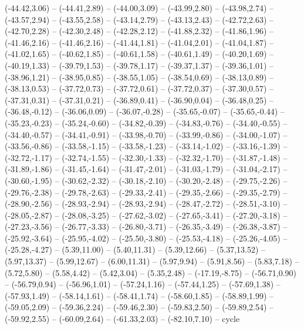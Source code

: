 {  (-44.42,3.06) -- (-44.41,2.89) -- (-44.00,3.09) -- (-43.99,2.80) -- (-43.98,2.74) -- (-43.57,2.94) -- (-43.55,2.58) --
  (-43.14,2.79) -- (-43.13,2.43) -- (-42.72,2.63) -- (-42.70,2.28) -- (-42.30,2.48) -- (-42.28,2.12) -- (-41.88,2.32) --
  (-41.86,1.96) -- (-41.46,2.16) -- (-41.46,2.16) -- (-41.44,1.81) -- (-41.04,2.01) -- (-41.04,1.87) -- (-41.02,1.65) --
  (-40.62,1.85) -- (-40.61,1.58) -- (-40.61,1.49) -- (-40.20,1.69) -- (-40.19,1.33) -- (-39.79,1.53) -- (-39.78,1.17) --
  (-39.37,1.37) -- (-39.36,1.01) -- (-38.96,1.21) -- (-38.95,0.85) -- (-38.55,1.05) -- (-38.54,0.69) -- (-38.13,0.89) --
  (-38.13,0.53) -- (-37.72,0.73) -- (-37.72,0.61) -- (-37.72,0.37) -- (-37.30,0.57) -- (-37.31,0.31) -- (-37.31,0.21) --
  (-36.89,0.41) -- (-36.90,0.04) -- (-36.48,0.25) -- (-36.48,-0.12) -- (-36.06,0.09) -- (-36.07,-0.28) -- (-35.65,-0.07) --
  (-35.65,-0.44) -- (-35.23,-0.23) -- (-35.24,-0.60) -- (-34.82,-0.39) -- (-34.83,-0.76) -- (-34.40,-0.55) -- (-34.40,-0.57) --
  (-34.41,-0.91) -- (-33.98,-0.70) -- (-33.99,-0.86) -- (-34.00,-1.07) -- (-33.56,-0.86) -- (-33.58,-1.15) -- (-33.58,-1.23) --
  (-33.14,-1.02) -- (-33.16,-1.39) -- (-32.72,-1.17) -- (-32.74,-1.55) -- (-32.30,-1.33) -- (-32.32,-1.70) -- (-31.87,-1.48) --
  (-31.89,-1.86) -- (-31.45,-1.64) -- (-31.47,-2.01) -- (-31.03,-1.79) -- (-31.04,-2.17) -- (-30.60,-1.95) -- (-30.62,-2.32) --
  (-30.18,-2.10) -- (-30.20,-2.48) -- (-29.75,-2.26) -- (-29.76,-2.38) -- (-29.78,-2.63) -- (-29.33,-2.41) -- (-29.35,-2.66) --
  (-29.35,-2.79) -- (-28.90,-2.56) -- (-28.93,-2.94) -- (-28.93,-2.94) -- (-28.47,-2.72) -- (-28.51,-3.10) -- (-28.05,-2.87) --
  (-28.08,-3.25) -- (-27.62,-3.02) -- (-27.65,-3.41) -- (-27.20,-3.18) -- (-27.23,-3.56) -- (-26.77,-3.33) -- (-26.80,-3.71) --
  (-26.35,-3.49) -- (-26.38,-3.87) -- (-25.92,-3.64) -- (-25.95,-4.02) -- (-25.50,-3.80) -- (-25.53,-4.18) -- (-25.26,-4.05) --
  (-25.28,-4.27) -- (5.39,11.00) -- (5.40,11.31) -- (5.39,12.66) -- (5.37,13.52) -- (5.97,13.37) -- (5.99,12.67) --
  (6.00,11.31) -- (5.97,9.94) -- (5.91,8.56) -- (5.83,7.18) -- (5.72,5.80) -- (5.58,4.42) -- (5.42,3.04) --
  (5.35,2.48) -- (-17.19,-8.75) -- (-56.71,0.90) -- (-56.79,0.94) -- (-56.96,1.01) -- (-57.24,1.16) -- (-57.44,1.25) --
  (-57.69,1.38) -- (-57.93,1.49) -- (-58.14,1.61) -- (-58.41,1.74) -- (-58.60,1.85) -- (-58.89,1.99) -- (-59.05,2.09) --
  (-59.36,2.24) -- (-59.46,2.30) -- (-59.83,2.50) -- (-59.89,2.54) -- (-59.92,2.55) -- (-60.09,2.64) -- (-61.33,2.03) --
  (-82.10,7.10) -- cycle}
